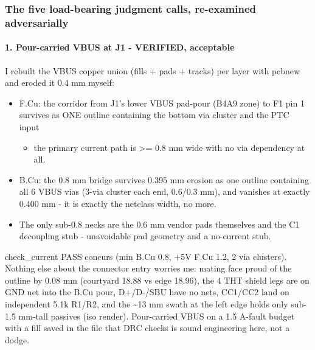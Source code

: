 \documentclass[11pt,a4paper]{article}
\begin{document}
\subsubsection*{The five load-bearing judgment calls, re-examined adversarially}
\paragraph*{1. Pour-carried VBUS at J1 - VERIFIED, acceptable}
I rebuilt the VBUS copper union (fills + pads + tracks) per layer with pcbnew and eroded it 0.4 mm myself:

\begin{itemize}
\item F.Cu: the corridor from J1's lower VBUS pad-pour (B4A9 zone) to F1 pin 1
survives as ONE outline containing the bottom via cluster and the PTC input
\begin{itemize}
\item the primary current path is \textgreater{}= 0.8 mm wide with no via dependency at all.
\end{itemize}
\item B.Cu: the 0.8 mm bridge survives 0.395 mm erosion as one outline containing
all 6 VBUS vias (3-via cluster each end, 0.6/0.3 mm), and vanishes at
exactly 0.400 mm - it is exactly the netclass width, no more.
\item The only sub-0.8 necks are the 0.6 mm vendor pads themselves and the C1
decoupling stub - unavoidable pad geometry and a no-current stub.
\end{itemize}
check\_current PASS concurs (min B.Cu 0.8, +5V F.Cu 1.2, 2 via clusters). Nothing else about the connector entry worries me: mating face proud of the outline by 0.08 mm (courtyard 18.88 vs edge 18.96), the 4 THT shield legs are on GND net into the B.Cu pour, D+/D-/SBU have no nets, CC1/CC2 land on independent 5.1k R1/R2, and the \textasciitilde{}13 mm swath at the left edge holds only sub-1.5 mm-tall passives (iso render). Pour-carried VBUS on a 1.5 A-fault budget with a fill saved in the file that DRC checks is sound engineering here, not a dodge.
\end{document}
